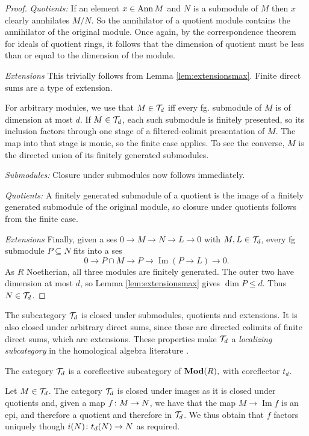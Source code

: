 \documentclass[runningheads]{llncs}
\begin{document}
\begin{textAtEnd}[category=omega3]
\begin{proof}
\emph{Quotients:} If an element $x\in \operatorname{Ann} M$ and $N$ is a submodule of $M$ then $x$ clearly annhilates $M/N.$ So the annihilator of a quotient module contains the annihilator of the original module.  Once again, by the correspondence theorem for ideals of quotient rings, it follows that the dimension of quotient must be less than or equal to the dimension of the module.

\emph{Extensions} This trivially follows from Lemma \ref{lem:extensionsmax}. Finite direct sums are a type of extension.

For arbitrary modules, we use that $M \in \mathcal T_d$ iff every fg. submodule of $M$ is of dimension at most $d$.
If $M \in \mathcal T_d$, each such submodule is finitely presented, so its inclusion factors through one stage of a filtered-colimit presentation of $M$.
The map into that stage is monic, so the finite case applies.
To see the converse, $M$ is the directed union of its finitely generated submodules.

\emph{Submodules:} Closure under submodules now follows immediately.

\emph{Quotients:} A finitely generated submodule of a quotient is the image of a finitely generated submodule of the original module, so closure under quotients follows from the finite case.

\emph{Extensions}  Finally, given a ses $0 \to M \to N \to L \to 0$ with $M, L \in \mathcal T_d$, every fg submodule $P \subseteq N$ fits into a ses
\begin{equation*}
0 \to P \cap M \to P \to \operatorname{Im}(P \to L) \to 0.
\end{equation*}
As $R$ Noetherian, all three modules are finitely generated.
The outer two have dimension at most $d$, so Lemma \ref{lem:extensionsmax} gives $\dim P \leq d$.
Thus $N \in \mathcal T_d$.
\end{proof}
\end{textAtEnd}
The subcategory $\mathcal T_d$ is closed under submodules, quotients and extensions.
It is also closed under arbitrary direct sums, since these are directed colimits of finite direct sums, which are extensions.
These properties make $\mathcal T_d$ a \emph{localizing subcategory} in the homological algebra literature \cite{gabriel62}.
\begin{propositionE}
The category $\mathcal T_d$ is a coreflective subcategory of $\operatorname{\mathbf{Mod}}(R),$ with coreflector $t_d.$
\end{propositionE}
\begin{proofE}
Let $M\in \mathcal T_d$. The category $\mathcal T_d$ is closed under images as it is closed under quotients and, given a map $f \colon M \to N$, we have that the map $M  \to \operatorname{Im}f$ is an epi, and therefore a quotient and therefore in $\mathcal T_d$. We thus obtain that $f$ factors uniquely though $i(N) \colon t_d(N) \to N$ as required. 
\end{proofE}
\end{document}
